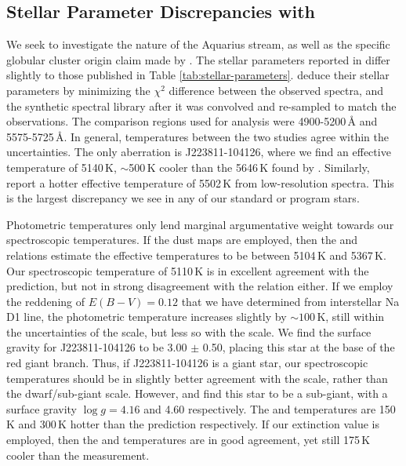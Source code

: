 \documentclass{emulateapj}
\begin{document}



\subsection{Stellar Parameter Discrepancies with \citet{wylie-de-boer;et-al_2012}}

We seek to investigate the nature of the Aquarius stream, as well as the specific globular cluster origin claim made by \citet{wylie-de-boer;et-al_2012}. The stellar parameters reported in \citet{wylie-de-boer;et-al_2012} differ slightly to those published in Table \ref{tab:stellar-parameters}. \citet{wylie-de-boer;et-al_2012} deduce their stellar parameters by minimizing the $\chi^2$ difference between the observed spectra, and the \citet{munari;et-al_2005} synthetic spectral library after it was convolved and re-sampled to match the observations. The comparison regions used for analysis were 4900-5200\,{\AA} and 5575-5725\,{\AA}. In general, temperatures between the two studies agree within the uncertainties. The only aberration is J223811-104126, where we find an effective temperature of 5140\,K, ${\sim}$500\,K cooler than the 5646\,K found by \citet{wylie-de-boer;et-al_2012}.  Similarly, \citet{williams;et-al_2011} report a hotter effective temperature of 5502\,K from low-resolution spectra. This is the largest discrepancy we see in any of our standard or program stars.

Photometric temperatures only lend marginal argumentative weight towards our spectroscopic temperatures. If the \citet{schlegel;et-al_1998} dust maps are employed, then the \citet{alonso;et-al_1999} and \citet{casagrande;et-al_2010} relations estimate the effective temperatures to be between 5104\,K and 5367\,K. Our spectroscopic temperature of 5110\,K is in excellent agreement with the \citet{alonso;et-al_1999} prediction, but not in strong disagreement with the \citet{casagrande;et-al_2010} relation either. If we employ the reddening of $E(B-V) = 0.12$ that we have determined from interstellar Na D1 line, the photometric temperature increases slightly by ${\sim}100$\,K, still within the uncertainties of the \citet{alonso;et-al_1999} scale, but less so with the \citet{casagrande;et-al_2010} scale. We find the surface gravity for J223811-104126 to be 3.00 $\pm$ 0.50, placing this star at the base of the red giant branch. Thus, if J223811-104126 is a giant star, our spectroscopic temperatures should be in slightly better agreement with the \citet{alonso;et-al_1999} scale, rather than the \citet{casagrande;et-al_2010} dwarf/sub-giant scale. However, \citet{williams;et-al_2011} and \citet{wylie-de-boer;et-al_2012} find this star to be a sub-giant, with a surface gravity $\log{g} = 4.16$ and 4.60 respectively. The \citet{williams;et-al_2011} and \citet{wylie-de-boer;et-al_2012} temperatures are 150\,K and 300\,K hotter than the \citet{casagrande;et-al_2010} prediction respectively. If our extinction value is employed, then the \citet{williams;et-al_2011} and \citet{casagrande;et-al_2010} temperatures are in good agreement, yet still 175\,K cooler than the \citet{wylie-de-boer;et-al_2012} measurement.
\end{document}
